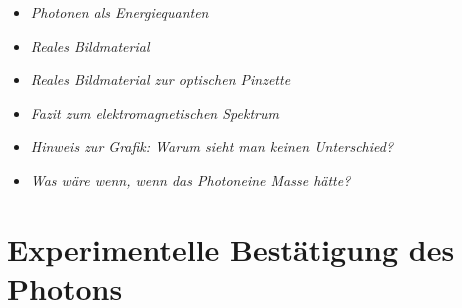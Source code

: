 \vspace{1em}
\begin{tcolorbox}[title=mathematische Boxen,mathebox]
\begin{itemize}
	\item \emph{Photonen als Energiequanten}\dotfill\pageref{box:Photon als Energiequanten}
\end{itemize}
\end{tcolorbox}

\vspace{1em}
\begin{tcolorbox}[title=Hinweisboxen,hinweisbox]
\begin{itemize}
	\item \emph{Reales Bildmaterial} \dotfill\pageref{keybox:RealesBildmaterial}
	\item \emph{Reales Bildmaterial zur optischen Pinzette} \dotfill\pageref{box:Manipulation kleiner Partikel}
	\item \emph{Fazit zum elektromagnetischen Spektrum} \dotfill\pageref{box:Fazit zum elektro}
	\item \emph{Hinweis zur Grafik: Warum sieht man \newline keinen Unterschied?} \dotfill\pageref{box:Warum sieht man}
\end{itemize}
\end{tcolorbox}



\vspace{1em}
\begin{tcolorbox}[title=hypothetische Boxen,hypobox]
\begin{itemize}
	\item \emph{Was wäre wenn, wenn das Photon\newline eine Masse hätte?} \dotfill\pageref{box:was wäre wenn}
\end{itemize}
\end{tcolorbox}


\section{Experimentelle Bestätigung des Photons}


